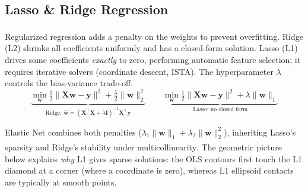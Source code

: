 \subsection{Lasso \& Ridge Regression}

\begin{tcbitemize}[ skin=sectionraster, halign lower=center ]
    \tcbitem[title={Ridge Regression (L2) and Lasso (L1)}, raster multicolumn=3]
    Regularized regression adds a penalty on the weights to prevent overfitting\textsuperscript{\cite[][pp.~91--97]{iiiCourseMachineLearning}}. Ridge (L2) shrinks all coefficients uniformly and has a closed-form solution. Lasso (L1) drives some coefficients \emph{exactly} to zero, performing automatic feature selection; it requires iterative solvers (coordinate descent, ISTA). The hyperparameter $\lambda$ controls the bias-variance trade-off.
    \tcblower
    \begin{equation}
        \underbrace{\min_{\mathbf{w}} \tfrac{1}{2}\|\mathbf{X}\mathbf{w}-\mathbf{y}\|^2 + \tfrac{\lambda}{2}\|\mathbf{w}\|_2^2}_{\text{Ridge: } \hat{\mathbf{w}}=(\mathbf{X}^\top\mathbf{X}+\lambda\mathbf{I})^{-1}\mathbf{X}^\top\mathbf{y}}
        \qquad
        \underbrace{\min_{\mathbf{w}} \tfrac{1}{2}\|\mathbf{X}\mathbf{w}-\mathbf{y}\|^2 + \lambda\|\mathbf{w}\|_1}_{\text{Lasso: no closed form}}
    \end{equation}

    \tcbitem[title={Elastic Net and the Geometry of Sparsity}, raster multicolumn=3]
    Elastic Net combines both penalties ($\lambda_1\|\mathbf{w}\|_1 + \lambda_2\|\mathbf{w}\|_2^2$), inheriting Lasso's sparsity and Ridge's stability under multicollinearity\textsuperscript{\cite[][pp.~91--97]{iiiCourseMachineLearning}}. The geometric picture below explains \emph{why} L1 gives sparse solutions: the OLS contours first touch the L1 diamond at a corner (where a coordinate is zero), whereas L1 ellipsoid contacts are typically at smooth points.
    \tcblower
\end{tcbitemize}
